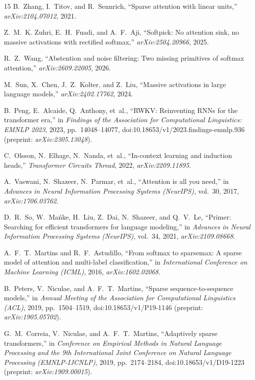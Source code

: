 \documentclass[11pt,a4paper]{article}
\begin{document}
\begin{thebibliography}{15}
B.~Zhang, I.~Titov, and R.~Sennrich, ``Sparse attention with linear units,''
\emph{arXiv:2104.07012}, 2021.

Z.~M.~K. Zuhri, E.~H.~Fuadi, and A.~F.~Aji, ``Softpick: No attention sink, no massive
activations with rectified softmax,'' \emph{arXiv:2504.20966}, 2025.

R.~Z.~Wang, ``Abstention and noise filtering: Two missing primitives of softmax attention,''
\emph{arXiv:2609.22005}, 2026.

M.~Sun, X.~Chen, J.~Z.~Kolter, and Z.~Liu, ``Massive activations in large language models,''
\emph{arXiv:2402.17762}, 2024.

B.~Peng, E.~Alcaide, Q.~Anthony, et~al., ``RWKV: Reinventing RNNs for the transformer era,''
in \emph{Findings of the Association for Computational Linguistics: EMNLP 2023}, 2023,
pp.~14048--14077, doi:10.18653/v1/2023.findings-emnlp.936 (preprint: \emph{arXiv:2305.13048}).

C.~Olsson, N.~Elhage, N.~Nanda, et~al., ``In-context learning and induction heads,''
\emph{Transformer Circuits Thread}, 2022, \emph{arXiv:2209.11895}.

A.~Vaswani, N.~Shazeer, N.~Parmar, et~al., ``Attention is all you need,'' in
\emph{Advances in Neural Information Processing Systems (NeurIPS)}, vol.~30, 2017,
\emph{arXiv:1706.03762}.

D.~R.~So, W.~Ma\'{n}ke, H.~Liu, Z.~Dai, N.~Shazeer, and Q.~V.~Le, ``Primer: Searching for
efficient transformers for language modeling,'' in \emph{Advances in Neural Information
Processing Systems (NeurIPS)}, vol.~34, 2021, \emph{arXiv:2109.08668}.

A.~F.~T.~Martins and R.~F.~Astudillo, ``From softmax to sparsemax: A sparse model of attention
and multi-label classification,'' in \emph{International Conference on Machine Learning (ICML)},
2016, \emph{arXiv:1602.02068}.

B.~Peters, V.~Niculae, and A.~F.~T.~Martins, ``Sparse sequence-to-sequence models,'' in
\emph{Annual Meeting of the Association for Computational Linguistics (ACL)}, 2019,
pp.~1504--1519, doi:10.18653/v1/P19-1146 (preprint: \emph{arXiv:1905.05702}).

G.~M.~Correia, V.~Niculae, and A.~F.~T.~Martins, ``Adaptively sparse transformers,'' in
\emph{Conference on Empirical Methods in Natural Language Processing and the 9th International
Joint Conference on Natural Language Processing (EMNLP-IJCNLP)}, 2019, pp.~2174--2184,
doi:10.18653/v1/D19-1223 (preprint: \emph{arXiv:1909.00015}).


\end{thebibliography}
\end{document}
